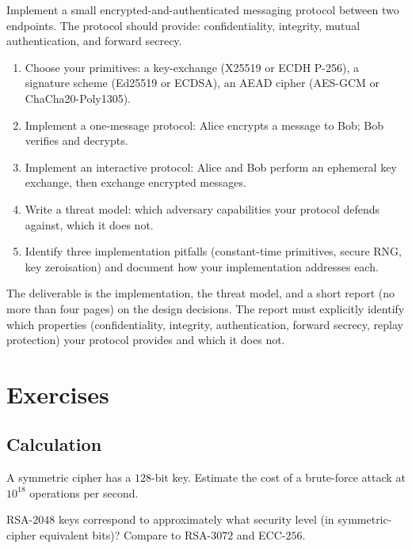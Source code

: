 \begin{project}
Implement a small encrypted-and-authenticated messaging protocol between two endpoints. The protocol should provide: confidentiality, integrity, mutual authentication, and forward secrecy.

\begin{enumerate}[leftmargin=*]
  \item Choose your primitives: a key-exchange (X25519 or ECDH P-256), a signature scheme (Ed25519 or ECDSA), an AEAD cipher (AES-GCM or ChaCha20-Poly1305).
  \item Implement a one-message protocol: Alice encrypts a message to Bob; Bob verifies and decrypts.
  \item Implement an interactive protocol: Alice and Bob perform an ephemeral key exchange, then exchange encrypted messages.
  \item Write a threat model: which adversary capabilities your protocol defends against, which it does not.
  \item Identify three implementation pitfalls (constant-time primitives, secure RNG, key zeroisation) and document how your implementation addresses each.
\end{enumerate}

The deliverable is the implementation, the threat model, and a short report (no more than four pages) on the design decisions. The report must explicitly identify which properties (confidentiality, integrity, authentication, forward secrecy, replay protection) your protocol provides and which it does not.
\end{project}

\section{Exercises}

\subsection*{Calculation}

\begin{exercise}
A symmetric cipher has a $128$-bit key. Estimate the cost of a brute-force attack at $10^{18}$ operations per second.
\end{exercise}

\begin{exercise}
RSA-$2048$ keys correspond to approximately what security level (in symmetric-cipher equivalent bits)? Compare to RSA-$3072$ and ECC-$256$.
\end{exercise}

